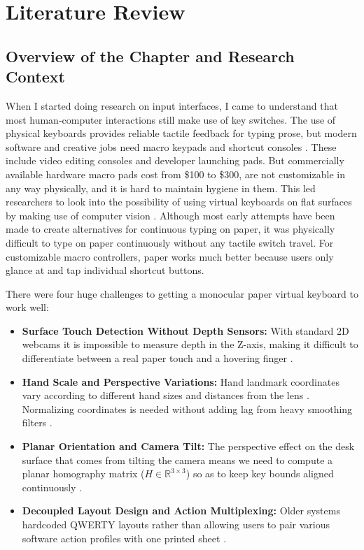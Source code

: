 \chapter{Literature Review}
\label{ch:literature_review}

\section{Overview of the Chapter and Research Context}
\label{sec:lit_chapter_overview}
When I started doing research on input interfaces, I came to understand that most human-computer interactions still make use of key switches. The use of physical keyboards provides reliable tactile feedback for typing prose, but modern software and creative jobs need macro keypads and shortcut consoles \cite{ReviewVirtualKeyboard2020, Lee2022Virtual}. These include video editing consoles and developer launching pads. But commercially available hardware macro pads cost from \$100 to \$300, are not customizable in any way physically, and it is hard to maintain hygiene in them. This led researchers to look into the possibility of using virtual keyboards on flat surfaces by making use of computer vision \cite{Zhang2001Visual, Srivastava2012RealTime, Khare2019QWERTY, Maman2023TypeNet}. Although most early attempts have been made to create alternatives for continuous typing on paper, it was physically difficult to type on paper continuously without any tactile switch travel. For customizable macro controllers, paper works much better because users only glance at and tap individual shortcut buttons.

There were four huge challenges to getting a monocular paper virtual keyboard to work well:
\begin{itemize}
    \item \textbf{Surface Touch Detection Without Depth Sensors:} With standard 2D webcams it is impossible to measure depth in the Z-axis, making it difficult to differentiate between a real paper touch and a hovering finger \cite{Thomas2013Camera, Posner2012Single, Lee2019Virtual, Toshpulatov2024RealTime}.
    \item \textbf{Hand Scale and Perspective Variations:} Hand landmark coordinates vary according to different hand sizes and distances from the lens \cite{Zhang2020MediaPipe, Doan2022Efficient}. Normalizing coordinates is needed without adding lag from heavy smoothing filters \cite{Kumar2026Hybrid}.
    \item \textbf{Planar Orientation and Camera Tilt:} The perspective effect on the desk surface that comes from tilting the camera means we need to compute a planar homography matrix ($H \in \mathbb{R}^{3 \times 3}$) so as to keep key bounds aligned continuously \cite{Wang2016AprilTag2, Kallwies2020Determining, Pirchheim2011Homography}.
    \item \textbf{Decoupled Layout Design and Action Multiplexing:} Older systems hardcoded QWERTY layouts rather than allowing users to pair various software action profiles with one printed sheet \cite{ReviewVirtualKeyboard2020}.
\end{itemize}

